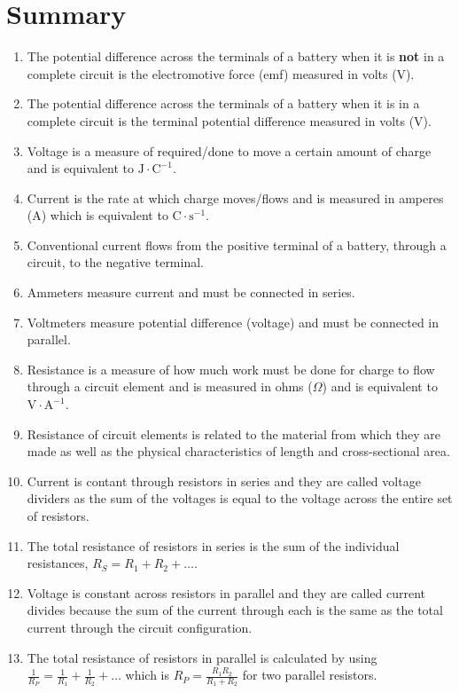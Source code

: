 \section{Summary}
\nopagebreak
\label{m38781*id201947}\begin{enumerate}[noitemsep, label=\textbf{\arabic*}. ] 
\item The potential difference across the terminals of a battery when it is \textbf{not} in a complete circuit is the electromotive force (emf) measured in volts (V).
\item The potential difference across the terminals of a battery when it is in a complete circuit is the terminal potential difference measured in volts (V).
\item Voltage is a measure of required/done to move a certain amount of charge and is equivalent to $\text{J}\cdot\text{C}^{-1}$.
\item Current is the rate at which charge moves/flows and is measured in amperes (A) which is equivalent to $\text{C}\cdot\text{s}^{-1}$.
\item Conventional current flows from the positive terminal of a battery, through a circuit, to the negative terminal.
\item Ammeters measure current and must be connected in series.
\item Voltmeters measure potential difference (voltage) and must be connected in parallel.
\item Resistance is a measure of how much work must be done for charge to flow through a circuit element and is measured in ohms ($\Omega$) and is equivalent to $\text{V}\cdot\text{A}^{-1}$.
\item Resistance of circuit elements is related to the material from which they are made as well as the physical characteristics of length and cross-sectional area.
\item Current is contant through resistors in series and they are called voltage dividers as the sum of the voltages is equal to the voltage across the entire set of resistors.
\item The total resistance of resistors in series is the sum of the individual resistances, $R_S=R_1+R_2+\ldots$.
\item Voltage is constant across resistors in parallel and they are called current divides because the sum of the current through each is the same as the total current through the circuit configuration.
\item The total resistance of resistors in parallel is calculated by using $\frac{1}{R_P}=\frac{1}{R_1}+\frac{1}{R_2}+\ldots$ which is $R_P=\frac{R_1R_2}{R_1+R_2}$ for two parallel resistors.
\end{enumerate}

